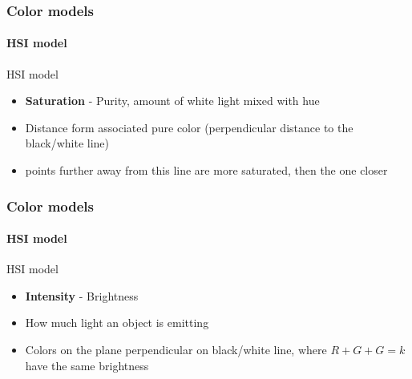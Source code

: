 \documentclass{beamer}
\begin{document}
\begin{frame}
\frametitle{Color models}
\framesubtitle{HSI model}
\begin{block}{HSI model}
\scriptsize{
\begin{itemize}
\item \textbf{Saturation} - Purity, amount of white light mixed with hue
\item Distance form associated pure color (perpendicular distance to the black/white line)
\item points further away from this line are more saturated, then the one closer\\
\end{itemize}}
\end{block}
\end{frame}
\begin{frame}
\frametitle{Color models}
\framesubtitle{HSI model}
\begin{block}{HSI model}
\scriptsize{
\begin{itemize}
\item \textbf{Intensity} - Brightness
\item How much light an object is emitting
\item Colors on the plane perpendicular on black/white line, where $R+G+G =k$ have the same brightness\\
\end{itemize}}
\end{block}
\end{frame}
\end{document}
